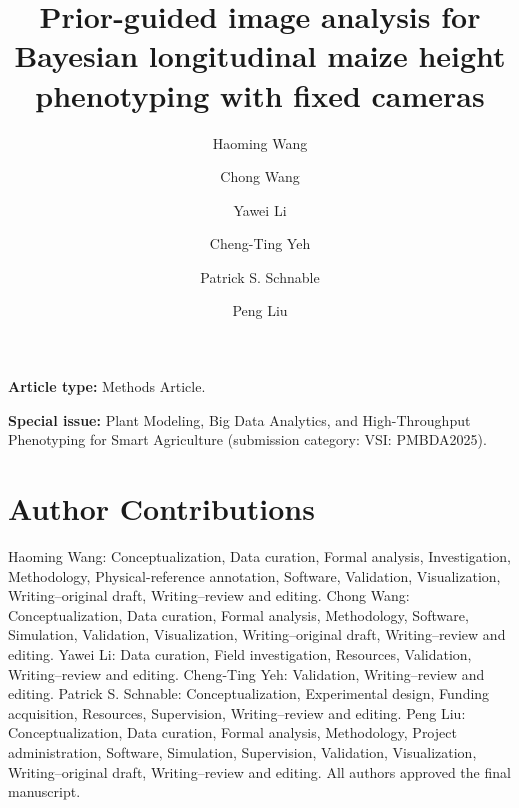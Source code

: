 \documentclass[review,12pt,authoryear]{elsarticle}
\begin{document}
\singlespacing
\begin{frontmatter}
\title{Prior-guided image analysis for Bayesian longitudinal maize height phenotyping with fixed cameras}
\author[stat]{Haoming Wang}
\author[stat,vet]{Chong Wang}
\author[psi,igg,agron]{Yawei Li}
\author[psi,agron]{Cheng-Ting Yeh}
\author[psi,igg,agron]{Patrick S. Schnable}
\author[stat]{Peng Liu}
\end{frontmatter}

\noindent\textbf{Article type:} Methods Article.

\noindent\textbf{Special issue:} Plant Modeling, Big Data Analytics, and High-Throughput Phenotyping for Smart Agriculture (submission category: VSI: PMBDA2025).

\section*{Author Contributions}
Haoming Wang: Conceptualization, Data curation, Formal analysis, Investigation, Methodology, Physical-reference annotation, Software, Validation, Visualization, Writing--original draft, Writing--review and editing. Chong Wang: Conceptualization, Data curation, Formal analysis, Methodology, Software, Simulation, Validation, Visualization, Writing--original draft, Writing--review and editing. Yawei Li: Data curation, Field investigation, Resources, Validation, Writing--review and editing. Cheng-Ting Yeh: Validation, Writing--review and editing. Patrick S. Schnable: Conceptualization, Experimental design, Funding acquisition, Resources, Supervision, Writing--review and editing. Peng Liu: Conceptualization, Data curation, Formal analysis, Methodology, Project administration, Software, Simulation, Supervision, Validation, Visualization, Writing--original draft, Writing--review and editing. All authors approved the final manuscript.
\end{document}
